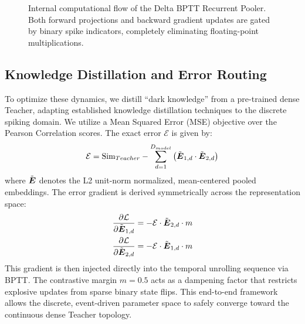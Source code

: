 \documentclass[10pt,a4paper,twoside]{article}
\begin{document}
\begin{figure}[t!]
\begin{center}
{%
}
\caption{Internal computational flow of the Delta BPTT Recurrent Pooler. Both forward projections and backward gradient updates are gated by binary spike indicators, completely eliminating floating-point multiplications.}
\label{fig:pooler_mech}
\end{center}
\end{figure}

\subsection{Knowledge Distillation and Error Routing}
To optimize these dynamics, we distill ``dark knowledge'' from a pre-trained dense Teacher, adapting established knowledge distillation techniques \cite{hinton2015distilling} to the discrete spiking domain. We utilize a Mean Squared Error (MSE) objective over the Pearson Correlation scores. The exact error $\mathcal{E}$ is given by:
\begin{equation}
\mathcal{E} = \text{Sim}_{Teacher} - \sum_{d=1}^{D_{model}} \left(\tilde{\boldsymbol{E}}_{1,d} \cdot \tilde{\boldsymbol{E}}_{2,d}\right)
\end{equation}
where $\tilde{\boldsymbol{E}}$ denotes the L2 unit-norm normalized, mean-centered pooled embeddings. The error gradient is derived symmetrically across the representation space:
\begin{align}
\frac{\partial \mathcal{L}}{\partial \tilde{\boldsymbol{E}}_{1,d}} &= -\mathcal{E} \cdot \tilde{\boldsymbol{E}}_{2,d} \cdot m \\
\frac{\partial \mathcal{L}}{\partial \tilde{\boldsymbol{E}}_{2,d}} &= -\mathcal{E} \cdot \tilde{\boldsymbol{E}}_{1,d} \cdot m
\end{align}
This gradient is then injected directly into the temporal unrolling sequence via BPTT. The contrastive margin $m=0.5$ acts as a dampening factor that restricts explosive updates from sparse binary state flips. This end-to-end framework allows the discrete, event-driven parameter space to safely converge toward the continuous dense Teacher topology.
\end{document}
